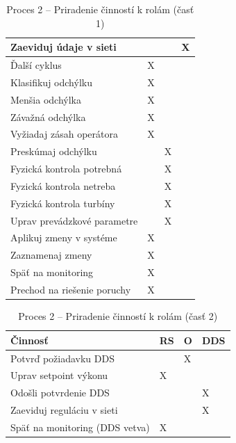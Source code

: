 \documentclass[12pt,a4paper]{article}
\begin{document}
\begin{table}[H]
\begin{tabularx}{\textwidth}{|X|p{}|p{}|p{}|}
    \hline
    Zaeviduj údaje v sieti & & & X \\
    \hline
    Ďalší cyklus & X & & \\
    \hline
    Klasifikuj odchýlku & X & & \\
    \hline
    Menšia odchýlka & X & & \\
    \hline
    Závažná odchýlka & X & & \\
    \hline
    Vyžiadaj zásah operátora & X & & \\
    \hline
    Preskúmaj odchýlku & & X & \\
    \hline
    Fyzická kontrola potrebná & & X & \\
    \hline
    Fyzická kontrola netreba & & X & \\
    \hline
    Fyzická kontrola turbíny & & X & \\
    \hline
    Uprav prevádzkové parametre & & X & \\
    \hline
    Aplikuj zmeny v systéme & X & & \\
    \hline
    Zaznamenaj zmeny & X & & \\
    \hline
    Späť na monitoring & X & & \\
    \hline
    Prechod na riešenie poruchy & X & & \\
    \hline
  \end{tabularx}
  \caption{Proces 2 -- Priradenie činností k rolám (časť 1)}
\end{table}

\begin{table}[H]
  \centering
  \small
  \renewcommand{\arraystretch}{1.2}
  \begin{tabularx}{\textwidth}{|X|p{}|p{}|p{}|}
    \hline
    \textbf{Činnosť} & \textbf{RS} & \textbf{O} & \textbf{DDS} \\
    \hline
     Potvrď požiadavku DDS & & X & \\
    \hline
    Uprav setpoint výkonu & X & & \\
    \hline
    Odošli potvrdenie DDS & & & X \\
    \hline
    Zaeviduj reguláciu v sieti & & & X \\
    \hline
    Späť na monitoring (DDS vetva) & X & & \\
    \hline
  \end{tabularx}
  \caption{Proces 2 -- Priradenie činností k rolám  (časť 2)}
\end{table}


\newpage
\end{document}
